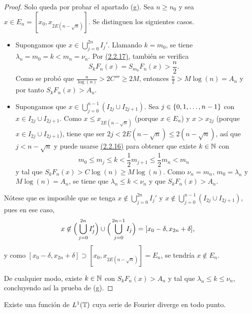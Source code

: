 \documentclass[a4paper, 12pt]{book}
\begin{document}
\begin{proof}
    Solo queda por probar el apartado (g). Sea $n \geq n_0$ y sea $x \in E_n=[x_0,x_{2E(n-\sqrt{n})}]$. Se distinguen los siguientes casos.
    \begin{itemize}
        \item Supongamos que $x\in\bigcup_{j=0}^{2n}I_j'$. Llamando $k = m_0$, se tiene $\lambda_n = m_0 = k < m_n = \nu_n$. Por \hyperref[2.2.17]{(2.2.17)}, también se verifica 
        \[S_{k}F_n(x) = S_{m_0}F_n(x) > \frac{n}{2}.\]
        Como se probó que $\frac{n}{\log(n)} > 2C''' \geq 2M$, entonces $\frac{n}{2} > M\log(n) = A_n$ y por tanto $S_kF_n(x) > A_n$.
        \item Supongamos que $x \in \bigcup_{j=0}^{n-1}(I_{2j}\cup I_{2j+1})$. Sea $j \in \{0,1,\mathellipsis,n-1\}$ con $x \in I_{2j} \cup I_{2j+1}$. Como $x \leq x_{2E(n-\sqrt{n})}$ (porque $x \in E_n$) y $x > x_{2j}$ (porque $x \in I_{2j} \cup I_{2j+1}$), tiene que ser $2j < 2E(n-\sqrt{n}) \leq 2(n-\sqrt{n})$, así que $j < n-\sqrt{n}$ y puede usarse \hyperref[2.2.16]{(2.2.16)} para obtener que existe $k \in \mathbb N$ con 
        \[m_0 \leq m_j \leq k < \frac{1}{2}m_{j+1} \leq \frac{1}{2}m_n < m_n\]
        y tal que $S_{k}F_n(x) >  C\log(n) \geq M\log(n)$. Como $\nu_n = m_n$, $m_0 = \lambda_n$ y $M\log(n) = A_n$, se tiene que $\lambda_n \leq k < \nu_n$ y que $S_{k}F_n(x) > A_n$.
    \end{itemize}
    Nótese que es imposible que se tenga $x\not\in \bigcup_{j=0}^{2n}I_j'$ y $x \not\in \bigcup_{j=0}^{n-1}(I_{2j}\cup I_{2j+1})$, pues en ese caso,
    \[x\not\in \Bigl(\,\bigcup_{j=0}^{2n}I_j'\Bigr) \cup\Bigl(\,\bigcup_{j=0}^{2n-1}I_j\Bigr) = [x_0-\delta,x_{2n}+\delta],\]
    y como $[x_0-\delta,x_{2n}+\delta] \supset [x_0,x_{2E(n-\sqrt{n})}] = E_n$, se tendría $x \not\in E_n$.

    De cualquier modo, existe $k \in \mathbb N$ con $S_kF_n(x) > A_n$ y tal que $\lambda_n \leq k \leq \nu_n$, concluyendo así la prueba de (g).
\end{proof}

\begin{theorem}
    Existe una función de $L^1(\mathbb T)$ cuya serie de Fourier diverge en todo punto.
\end{theorem}
\end{document}
